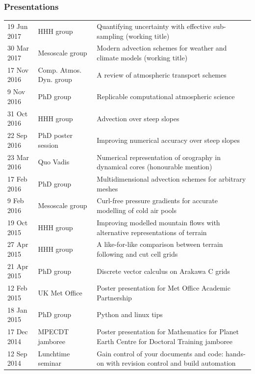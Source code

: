 \documentclass[a4paper,11pt]{article}
\begin{document}
\subsubsection*{Presentations}
\begin{tabularx}{\linewidth}{l l X}
19 Jun 2017 & HHH group & Quantifying uncertainty with effective sub-sampling (working title) \\
30 Mar 2017 & Mesoscale group & Modern advection schemes for weather and climate models (working title) \\
17 Nov 2016 & Comp. Atmos. Dyn. group & A review of atmospheric transport schemes \\
9 Nov 2016 & PhD group & Replicable computational atmospheric science \\
31 Oct 2016 & HHH group & Advection over steep slopes \\
22 Sep 2016 & PhD poster session & Improving numerical accuracy over steep slopes \\
23 Mar 2016 & Quo Vadis & Numerical representation of orography in dynamical cores (honourable mention) \\
17 Feb 2016 & PhD group & Multidimensional advection schemes for arbitrary meshes \\
9 Feb 2016 & Mesoscale group & Curl-free pressure gradients for accurate modelling of cold air pools \\
19 Oct 2015 & HHH group & Improving modelled mountain flows with alternative representations of terrain \\
27 Apr 2015 & HHH group & A like-for-like comparison between terrain following and cut cell grids \\
21 Apr 2015 & PhD group & Discrete vector calculus on Arakawa C grids \\
12 Feb 2015 & UK Met Office & Poster presentation for Met Office Academic Partnership \\
18 Jan 2015 & PhD group & Python and linux tips \\
17 Dec 2014 & MPECDT jamboree & Poster presentation for Mathematics for Planet Earth Centre for Doctoral Training jamboree \\
12 Sep 2014 & Lunchtime seminar  & Gain control of your documents and code: hands-on with revision control and build automation \\
\end{tabularx}
\end{document}
